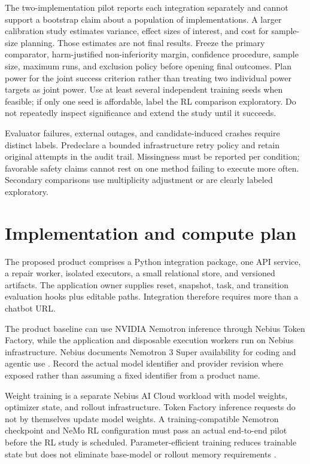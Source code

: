 \documentclass[11pt,a4paper]{article}
\begin{document}
The two-implementation pilot reports each integration separately and cannot support a bootstrap claim about a population of implementations. A larger calibration study estimates variance, effect sizes of interest, and cost for sample-size planning. Those estimates are not final results. Freeze the primary comparator, harm-justified non-inferiority margin, confidence procedure, sample size, maximum runs, and exclusion policy before opening final outcomes. Plan power for the joint success criterion rather than treating two individual power targets as joint power. Use at least several independent training seeds when feasible; if only one seed is affordable, label the RL comparison exploratory. Do not repeatedly inspect significance and extend the study until it succeeds.

Evaluator failures, external outages, and candidate-induced crashes require distinct labels. Predeclare a bounded infrastructure retry policy and retain original attempts in the audit trail. Missingness must be reported per condition; favorable safety claims cannot rest on one method failing to execute more often. Secondary comparisons use multiplicity adjustment or are clearly labeled exploratory.

\section{Implementation and compute plan}
The proposed product comprises a Python integration package, one API service, a repair worker, isolated executors, a small relational store, and versioned artifacts. The application owner supplies reset, snapshot, task, and transition evaluation hooks plus editable paths. Integration therefore requires more than a chatbot URL.

The product baseline can use NVIDIA Nemotron inference through Nebius Token Factory, while the application and disposable execution workers run on Nebius infrastructure. Nebius documents Nemotron 3 Super availability for coding and agentic use \cite{ref15}. Record the actual model identifier and provider revision where exposed rather than assuming a fixed identifier from a product name.

Weight training is a separate Nebius AI Cloud workload with model weights, optimizer state, and rollout infrastructure. Token Factory inference requests do not by themselves update model weights. A training-compatible Nemotron checkpoint and NeMo RL configuration must pass an actual end-to-end pilot before the RL study is scheduled. Parameter-efficient training reduces trainable state but does not eliminate base-model or rollout memory requirements \cite{ref13,ref14}.
\end{document}
